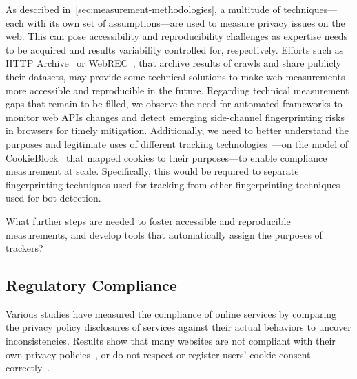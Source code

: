 As described in~\autoref{sec:measurement-methodologies}, a multitude of techniques---each with its own set of assumptions---are used to measure privacy issues on the web. This can pose accessibility and reproducibility challenges as expertise needs to be acquired and results variability controlled for, respectively.
%
Efforts such as HTTP Archive~\cite{httparchiveHTTPArchive} or WebREC~\cite{hantkeWebExecutionBundles2025}, that archive results of crawls and share publicly their datasets, may provide some technical solutions to make web measurements more accessible and reproducible in the future.
%
Regarding technical measurement gaps that remain to be filled, we observe the need for automated frameworks to monitor web APIs changes and detect emerging side-channel fingerprinting risks in browsers for timely mitigation. Additionally, we need to better understand the purposes and legitimate uses of different tracking technologies~\cite{tothContributionPublicConsultation2020}---on the model of CookieBlock~\cite{bollingerAutomatingCookieConsent2022} that mapped cookies to their purposes---to enable compliance measurement at scale. Specifically, this would be required to separate fingerprinting techniques used for tracking from other fingerprinting techniques used for bot detection. 

\begin{opbox}
What further steps are needed to foster accessible and reproducible measurements, and develop tools that automatically assign the purposes of trackers?
\end{opbox}


\subsection{Regulatory Compliance}
\label{sec:compliance}

Various studies have measured the compliance of online services by comparing the privacy policy disclosures of services against their actual behaviors to uncover inconsistencies. Results show that many websites are not compliant with their own privacy policies~\cite{libertAutomatedApproachAuditing2018,ouViopolicyDetectorAutomatedApproach2022}, or do not respect or register users’ cookie consent correctly~\cite{carpinetoAutomaticAssessmentWebsite2016,sanchezrolaCanIOptOutYet2019,matteCookieBannersRespect2020,mehrnezhadCrossPlatformEvaluationPrivacy2020,bouhoulaAutomatedLargeScaleAnalysis2024,vannortwickSettingBarLow2022,birrellSoKTechnicalImplementation2024,Kanc-etal-25-PETs}. 


